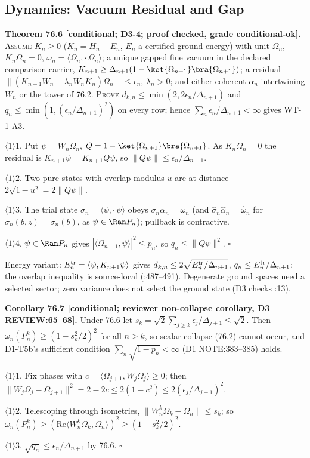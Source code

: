 \subsection{Dynamics: Vacuum Residual and Gap}

\textbf{Theorem 76.6 [conditional; D3-4; proof checked, grade conditional-ok].}  \textsc{Assume} \(K_n\ge0\)
(\(K_n=H_n-E_n\), \(E_n\) a certified ground energy) with unit \(\Omega_n\), \(K_n\Omega_n=0\),
\(\omega_n=\langle\Omega_n,\cdot\,\Omega_n\rangle\); a unique gapped fine vacuum in the declared comparison carrier,
\(K_{n+1}\ge\Delta_{n+1}(1-\ket{\Omega_{n+1}}\bra{\Omega_{n+1}})\); a residual
\(\|(K_{n+1}W_n-\lambda_nW_nK_n)\Omega_n\|\le\epsilon_n\), \(\lambda_n>0\); and either coherent \(\alpha_n\) intertwining
\(W_n\) or the tower of 76.2.  \textsc{Prove} \(d_{k,n}\le\min(2,2\epsilon_n/\Delta_{n+1})\) and
\(q_n\le\min(1,(\epsilon_n/\Delta_{n+1})^2)\) on every row; hence \(\sum_n\epsilon_n/\Delta_{n+1}<\infty\) gives WT-1 A3.
\par\(\langle1\rangle1\). Put \(\psi=W_n\Omega_n\), \(Q=1-\ket{\Omega_{n+1}}\bra{\Omega_{n+1}}\).  As \(K_n\Omega_n=0\) the
residual is \(K_{n+1}\psi=K_{n+1}Q\psi\), so \(\|Q\psi\|\le\epsilon_n/\Delta_{n+1}\).
\par\(\langle1\rangle2\). Two pure states with overlap modulus \(u\) are at distance \(2\sqrt{1-u^2}=2\|Q\psi\|\).
\par\(\langle1\rangle3\). The trial state \(\sigma_n=\langle\psi,\cdot\,\psi\rangle\) obeys \(\sigma_n\alpha_n=\omega_n\) (and
\(\hat\sigma_n\hat\alpha_n=\hat\omega_n\) for \(\hat\sigma_n(b,z)=\sigma_n(b)\), as \(\psi\in\Ran P_n\)); pullback is contractive.
\par\(\langle1\rangle4\). \(\psi\in\Ran P_n\) gives \(|\langle\Omega_{n+1},\psi\rangle|^2\le p_n\), so
\(q_n\le\|Q\psi\|^2\).  \(\square\)
\par Energy variant: \(E^{\rm tr}_n=\langle\psi,K_{n+1}\psi\rangle\) gives \(d_{k,n}\le2\sqrt{E^{\rm tr}_n/\Delta_{n+1}}\),
\(q_n\le E^{\rm tr}_n/\Delta_{n+1}\); the overlap inequality is source-local (:487--491).
Degenerate ground spaces need a selected sector; zero variance does not select the ground state (D3 checks
:13).

\textbf{Corollary 76.7 [conditional; reviewer non-collapse corollary, D3 REVIEW:65--68].}  Under 76.6 let
\(s_k=\sqrt2\sum_{j\ge k}\epsilon_j/\Delta_{j+1}\le\sqrt2\).  Then \(\omega_n(P^k_n)\ge(1-s_k^2/2)^2\) for all \(n>k\), so
scalar collapse (76.2) cannot occur, and D1-T5b's sufficient condition \(\sum_n\sqrt{1-p_n}<\infty\) (D1 NOTE:383--385)
holds.
\par\(\langle1\rangle1\). Fix phases with \(c=\langle\Omega_{j+1},W_j\Omega_j\rangle\ge0\); then
\(\|W_j\Omega_j-\Omega_{j+1}\|^2=2-2c\le2(1-c^2)\le2(\epsilon_j/\Delta_{j+1})^2\).
\par\(\langle1\rangle2\). Telescoping through isometries, \(\|W^k_n\Omega_k-\Omega_n\|\le s_k\); so
\(\omega_n(P^k_n)\ge(\mathrm{Re}\langle W^k_n\Omega_k,\Omega_n\rangle)^2\ge(1-s_k^2/2)^2\).
\par\(\langle1\rangle3\). \(\sqrt{q_n}\le\epsilon_n/\Delta_{n+1}\) by 76.6.  \(\square\)

